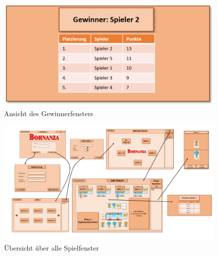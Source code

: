 \begin{figure}
	\centering
	\includegraphics{img/gew}
	\caption{Ansicht des Gewinnerfensters}
	\label{gui:gew}
\end{figure}

\begin{figure}
	\centering
	\includegraphics{img/uebersicht}
	\caption{Übersicht über alle Spielfenster}
	\label{gui:uebersicht}
\end{figure}